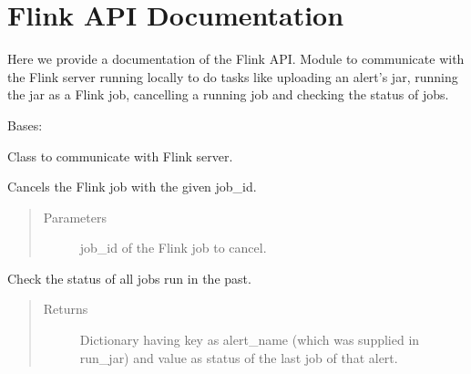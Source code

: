 \documentclass[letterpaper,10pt,english]{sphinxmanual}
\begin{document}
\section{Flink API Documentation}
\label{\detokenize{flink:flink-api-documentation}}
Here we provide a documentation of the Flink API.
\label{\detokenize{flink:module-flink_api}}
Module to communicate with the Flink server running locally to do tasks like uploading an alert’s jar, running the jar as a Flink job,
cancelling a running job and checking the status of jobs.

\begin{fulllineitems}
\label{\detokenize{flink:flink_api.FlinkAPI}}
Bases: 

Class to communicate with Flink server.

\begin{fulllineitems}
\label{\detokenize{flink:flink_api.FlinkAPI.cancel_job}}
Cancels the Flink job with the given job\_id.
\begin{quote}\begin{description}
\item[{Parameters}] \leavevmode
{} \textendash{} job\_id of the Flink job to cancel.

\end{description}\end{quote}

\end{fulllineitems}


\begin{fulllineitems}
\label{\detokenize{flink:flink_api.FlinkAPI.check_job_status_all}}
Check the status of all jobs run in the past.
\begin{quote}\begin{description}
\item[{Returns}] \leavevmode
Dictionary having key as alert\_name (which was supplied in run\_jar) and value as status of the last job of that alert.


\end{description}
\end{quote}
\end{fulllineitems}
\end{fulllineitems}
\end{document}
